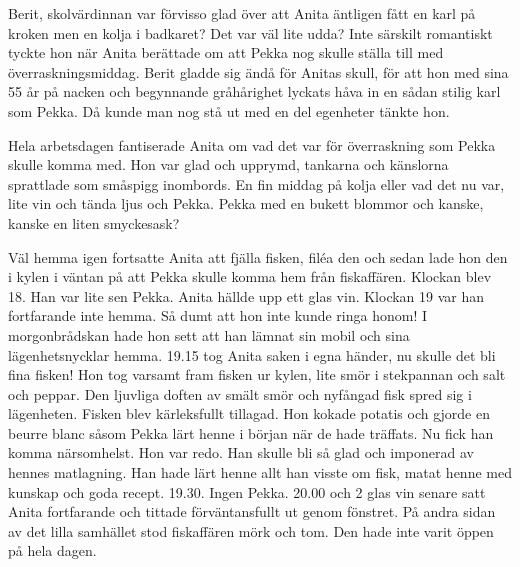 Berit, skolvärdinnan var förvisso glad över att Anita äntligen fått en karl på kroken men en kolja i badkaret? Det var väl lite udda? Inte särskilt romantiskt tyckte hon när Anita berättade om att Pekka nog skulle ställa till med överraskningsmiddag. Berit gladde sig ändå för Anitas skull, för att hon med sina 55 år på nacken och begynnande gråhårighet lyckats håva in en sådan stilig karl som Pekka. Då kunde man nog stå ut med en del egenheter tänkte hon. 

Hela arbetsdagen fantiserade Anita om vad det var för överraskning som Pekka skulle komma med. Hon var glad och upprymd, tankarna och känslorna sprattlade som småspigg inombords. En fin middag på kolja eller vad det nu var, lite vin och tända ljus och Pekka. Pekka med en bukett blommor och kanske, kanske en liten smyckesask?

Väl hemma igen fortsatte Anita att fjälla fisken, filéa den och sedan lade hon den i kylen i väntan på att Pekka skulle komma hem från fiskaffären. Klockan blev 18. Han var lite sen Pekka. Anita hällde upp ett glas vin. Klockan 19 var han fortfarande inte hemma. Så dumt att hon inte kunde ringa honom! I morgonbrådskan hade hon sett att han lämnat sin mobil och sina lägenhetsnycklar hemma. 19.15 tog Anita saken i egna händer, nu skulle det bli fina fisken! Hon tog varsamt fram fisken ur kylen, lite smör i stekpannan och salt och peppar. Den ljuvliga doften av smält smör och nyfångad fisk spred sig i lägenheten. Fisken blev kärleksfullt tillagad. Hon kokade potatis och gjorde en beurre blanc såsom Pekka lärt henne i början när de hade träffats. Nu fick han komma närsomhelst. Hon var redo. Han skulle bli så glad och imponerad av hennes matlagning. Han hade lärt henne allt han visste om fisk, matat henne med kunskap och goda recept. 19.30. Ingen Pekka. 20.00 och 2 glas vin senare satt Anita fortfarande och tittade förväntansfullt ut genom fönstret. På andra sidan av det lilla samhället stod fiskaffären mörk och tom. Den hade inte varit öppen på hela dagen.
